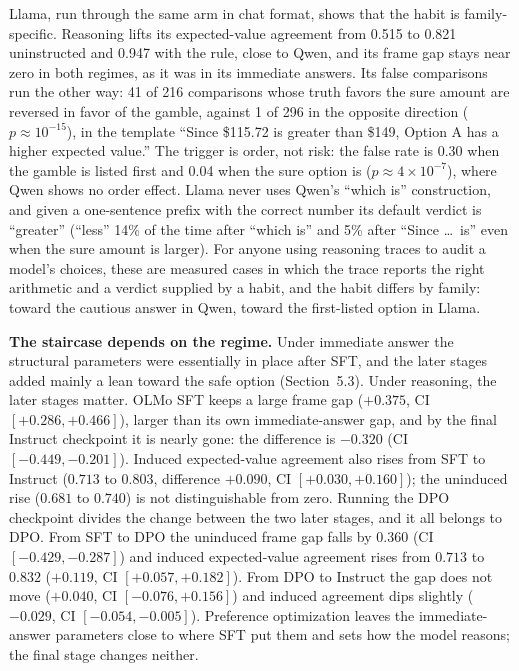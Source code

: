 \documentclass[11pt]{article}
\begin{document}
Llama, run through the same arm in chat format, shows that the habit is family-specific. Reasoning lifts
its expected-value agreement from 0.515 to 0.821 uninstructed and 0.947 with the rule, close to Qwen,
and its frame gap stays near zero in both regimes, as it was in its immediate answers. Its false
comparisons run the other way: 41 of 216 comparisons whose truth favors the sure amount are reversed in
favor of the gamble, against 1 of 296 in the opposite direction ($p \approx 10^{-15}$), in the template
``Since \$115.72 is greater than \$149, Option A has a higher expected value.'' The trigger is order, not
risk: the false rate is 0.30 when the gamble is listed first and 0.04 when the sure option is ($p
\approx 4\times10^{-7}$), where Qwen shows no order effect. Llama never uses Qwen's ``which is''
construction, and given a one-sentence prefix with the correct number its default verdict is
``greater'' (``less'' 14\% of the time after ``which is'' and 5\% after ``Since \ldots\ is'' even when
the sure amount is larger). For anyone using reasoning traces to audit a model's choices, these are
measured cases in which the trace reports the right arithmetic and a verdict supplied by a habit, and
the habit differs by family: toward the cautious answer in Qwen, toward the first-listed option in
Llama.

\textbf{The staircase depends on the regime.} Under immediate answer the structural parameters were
essentially in place after SFT, and the later stages added mainly a lean toward the safe option
(Section~5.3). Under reasoning, the later stages
matter. OLMo SFT keeps a large frame gap ($+0.375$, CI $[+0.286, +0.466]$), larger than its own
immediate-answer gap, and by the final Instruct checkpoint it is nearly gone: the difference is $-0.320$
(CI $[-0.449, -0.201]$). Induced expected-value agreement also rises from SFT to Instruct ($0.713$ to
$0.803$, difference $+0.090$, CI $[+0.030, +0.160]$); the uninduced rise ($0.681$ to $0.740$) is not
distinguishable from zero. Running the DPO checkpoint divides the change between the two later stages,
and it all belongs to DPO. From SFT to DPO the uninduced frame gap falls by $0.360$ (CI $[-0.429,
-0.287]$) and induced expected-value agreement rises from $0.713$ to $0.832$ ($+0.119$, CI $[+0.057,
+0.182]$). From DPO to Instruct the gap does not move ($+0.040$, CI $[-0.076, +0.156]$) and induced
agreement dips slightly ($-0.029$, CI $[-0.054, -0.005]$). Preference optimization leaves the
immediate-answer parameters close to where SFT put them and sets how the model reasons; the final stage
changes neither.
\end{document}

